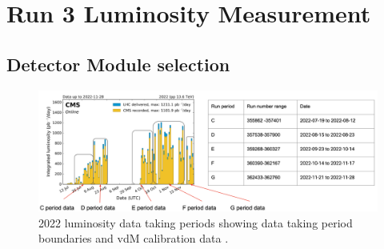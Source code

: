\chapter{Run 3 Luminosity Measurement}  %

\ifpdf
    \graphicspath{{Chapter1/Figs/Raster/}{Chapter1/Figs/PDF/}{Chapter1/Figs/}}
\else
    \graphicspath{{Chapter1/Figs/Vector/}{Chapter1/Figs/}}
\fi










\section{Detector Module selection}


\begin{figure}[!htp]
\centering
\includegraphics[width=1\textwidth]{ashish_thesis/2022_dataset.png}
\caption[2018 CMS luminosity data taking periods.]{%
   2022 luminosity data taking periods showing data taking period boundaries and vdM calibration data  \cite{CERNLumiPublicResults}.
}
\label{fig:period_bound}
\end{figure}



